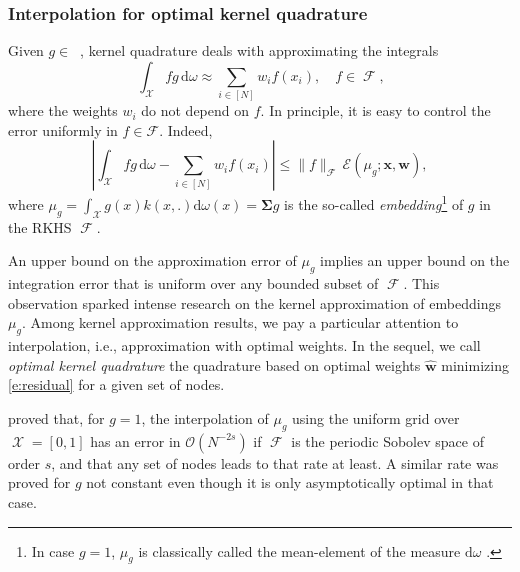 \documentclass[twoside,11pt]{book}
\DeclareMathOperator{\F}{\mathcal{F}}
\DeclareMathOperator{\X}{\mathcal{X}}
\DeclareMathOperator{\Ltwo}{\mathbb{L}_{2}(\mathrm{d} \omega)}
\newcommand{\rb}[1]{\textcolor{magenta}{#1}}
\begin{document}
\subsubsection{Interpolation for optimal kernel quadrature}\label{sec:review_optimal_kernel_quadrature}

Given $g \in \Ltwo$, kernel quadrature deals with approximating the integrals
\begin{equation}
\:\int_{\X} fg \,\mathrm{d}\omega \approx \sum\limits_{i \in [N]} w_{i}f(x_{i}),\quad f\in\F,
\end{equation}
where the weights $w_{i}$ do not depend on $f$.
In principle, it is easy to control the error uniformly in $f\in\mathcal{F}$. Indeed,
\begin{equation}\label{eq:upper_bound_integration_error}
\left| \int_{\X} fg \,\mathrm{d}\omega - \sum_{i \in [N]} w_{i}f(x_{i})\right| \leq \|f\|_{\F} \, \mathcal{E}(\mu_{g};\bm{x},\bm{w}),
\end{equation}
where
$ \displaystyle
\mu_{g} = \int_{\X}g(x)k(x,.) \mathrm{d}\omega(x){=\bm{\Sigma} g}
$
is the so-called \emph{embedding}\footnote{In case $g =1$, $\mu_{g}$ is classically called the mean-element of the measure $\mathrm{d} \omega$ \citep{SmGrSoSc07}.} of $g$ in the RKHS $\F$.

An upper bound on the approximation error of $\mu_{g}$ implies an upper bound on the integration error that is uniform over any bounded subset of $\F$. This observation sparked intense research on the kernel approximation of embeddings $\mu_{g}$. Among kernel approximation results, we pay a particular attention to interpolation, i.e., approximation with optimal weights. In the sequel, we call \emph{optimal kernel quadrature} the quadrature based on optimal weights $\hat{\bm{w}}$ minimizing \eqref{e:residual} for a given set of nodes.

\cite{Boj81} proved that, for $g=1$, the interpolation of $\mu_{g}$ using the uniform grid over $\X = [0,1]$ has an error in $\mathcal{O}(N^{-2s})$ if $\F$ is the periodic Sobolev space of order $s$, and that any set of nodes leads to that rate at least. A similar rate was proved for $g$ not constant \citep{NoUlWo15} even though it is only asymptotically optimal in that case.
\end{document}
